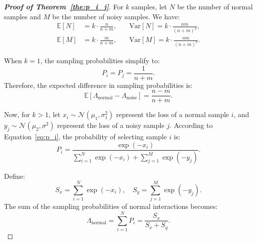 \begin{proof}[\textbf{Proof of Theorem~\ref{the:p_i_j}}]
\label{prf:the_p}
    For \( k \) samples, let \( N \) be the number of normal samples and \( M \) be the number of noisy samples. We have:
    \begin{equation*}
        \begin{aligned}
            \mathbb{E}[N] &= k \cdot \frac{n}{n+m}, \quad &\mathrm{Var}[N] = k \cdot \frac{nm}{(n+m)^2}, \\
            \mathbb{E}[M] &= k \cdot \frac{m}{n+m}, \quad &\mathrm{Var}[M] = k \cdot \frac{nm}{(n+m)^2}.
        \end{aligned}
    \end{equation*}

    When \( k = 1 \), the sampling probabilities simplify to:
    \begin{equation*}
        P_i = P_j = \frac{1}{n+m}.
    \end{equation*}
    Therefore, the expected difference in sampling probabilities is:
    \begin{equation*}
        \mathbb{E}[\Lambda_{\text{normal}} - \Lambda_{\text{noise}}] = \frac{n - m}{n + m}.
    \end{equation*}
    
    Now, for \( k > 1 \), let \( x_i \sim \mathcal{N}(\mu_1, \sigma_1^2) \) represent the loss of a normal sample \( i \), and \( y_j \sim \mathcal{N}(\mu_2, \sigma^2) \) represent the loss of a noisy sample \( j \). According to Equation~\ref{eq:p_i}, the probability of selecting sample \( i \) is:
    \begin{equation*}
        P_i = \frac{\exp(-x_i)}{\sum_{i=1}^N \exp(-x_i) + \sum_{j=1}^M \exp(-y_j)}.
    \end{equation*}
    
    Define:
    \begin{equation*}
        S_x = \sum_{i=1}^N \exp(-x_i), \quad S_y = \sum_{j=1}^M \exp(-y_j).
    \end{equation*}
    The sum of the sampling probabilities of normal interactions becomes:
    \begin{equation*}
        \Lambda_{\text{normal}} = \sum_{i=1}^N P_i = \frac{S_x}{S_x + S_y}.
    \end{equation*}


\end{proof}
